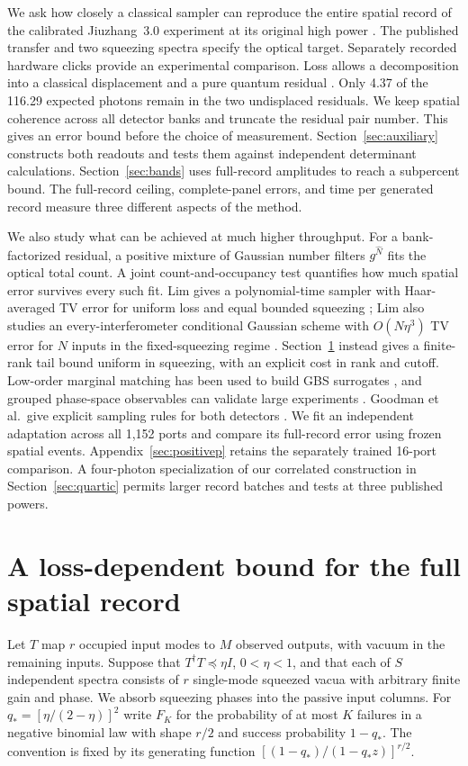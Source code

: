 \documentclass[11pt]{article}
\begin{document}
We ask how closely a classical sampler can reproduce the entire spatial record of the calibrated Jiuzhang~3.0 experiment at its original high power \cite{jiuzhang}. The published transfer and two squeezing spectra specify the optical target. Separately recorded hardware clicks provide an experimental comparison. Loss allows a decomposition into a classical displacement and a pure quantum residual \cite{oh}. Only 4.37 of the 116.29 expected photons remain in the two undisplaced residuals. We keep spatial coherence across all detector banks and truncate the residual pair number. This gives an error bound before the choice of measurement. Section~\ref{sec:auxiliary} constructs both readouts and tests them against independent determinant calculations. Section~\ref{sec:bands} uses full-record amplitudes to reach a subpercent bound. The full-record ceiling, complete-panel errors, and time per generated record measure three different aspects of the method.

We also study what can be achieved at much higher throughput. For a bank-factorized residual, a positive mixture of Gaussian number filters $g^{\hat N}$ \cite{walk} fits the optical total count. A joint count-and-occupancy test quantifies how much spatial error survives every such fit. Lim gives a polynomial-time sampler with Haar-averaged TV error for uniform loss and equal bounded squeezing \cite{lim}; Lim also studies an every-interferometer conditional Gaussian scheme with $O(N\eta^3)$ TV error for $N$ inputs in the fixed-squeezing regime \cite{limevery}. Section~\ref{sec:family} instead gives a finite-rank tail bound uniform in squeezing, with an explicit cost in rank and cutoff. Low-order marginal matching has been used to build GBS surrogates \cite{villalonga}, and grouped phase-space observables can validate large experiments \cite{dellios}. Goodman et al.\ give explicit sampling rules for both detectors \cite{goodman}. We fit an independent adaptation across all 1,152 ports and compare its full-record error using frozen spatial events. Appendix~\ref{sec:positivep} retains the separately trained 16-port comparison. A four-photon specialization of our correlated construction in Section~\ref{sec:quartic} permits larger record batches and tests at three published powers.

\section{A loss-dependent bound for the full spatial record}\label{sec:family}
Let $T$ map $r$ occupied input modes to $M$ observed outputs, with vacuum in the remaining inputs. Suppose that $T^\dagger T\preceq\eta I$, $0<\eta<1$, and that each of $S$ independent spectra consists of $r$ single-mode squeezed vacua with arbitrary finite gain and phase. We absorb squeezing phases into the passive input columns. For $q_*=[\eta/(2-\eta)]^2$ write $F_K$ for the probability of at most $K$ failures in a negative binomial law with shape $r/2$ and success probability $1-q_*$. The convention is fixed by its generating function $[(1-q_*)/(1-q_*z)]^{r/2}$.
\end{document}
